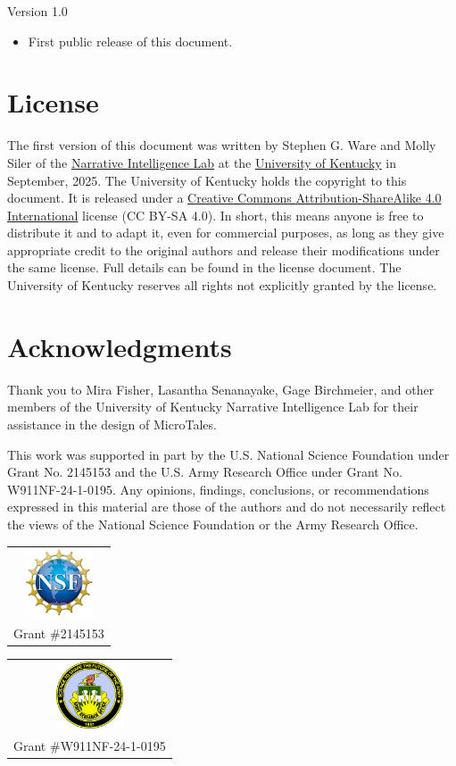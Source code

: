 \documentclass{nilreport}
\begin{document}
Version 1.0
\begin{itemize}
	\item First public release of this document.
\end{itemize}

\section{License}

The first version of this document was written by Stephen G. Ware and Molly Siler of the \href{http://cs.uky.edu/~sgware}{Narrative Intelligence Lab} at the \href{http://cs.uky.edu}{University of Kentucky} in September, 2025. The University of Kentucky holds the copyright to this document. It is released under a \href{http://creativecommons.org/licenses/by-sa/4.0/deed.en}{Creative Commons Attribution-ShareAlike 4.0 International} license (CC BY-SA 4.0). In short, this means anyone is free to distribute it and to adapt it, even for commercial purposes, as long as they give appropriate credit to the original authors and release their modifications under the same license. Full details can be found in the license document. The University of Kentucky reserves all rights not explicitly granted by the license.

\section{Acknowledgments}

Thank you to Mira Fisher, Lasantha Senanayake, Gage Birchmeier, and other members of the University of Kentucky Narrative Intelligence Lab for their assistance in the design of MicroTales.

This work was supported in part by the U.S. National Science Foundation under Grant No. 2145153 and the U.S. Army Research Office under Grant No. W911NF-24-1-0195. Any opinions, findings, conclusions, or recommendations expressed in this material are those of the authors and do not necessarily reflect the views of the National Science Foundation or the Army Research Office.

\begin{center}
\begin{tabular}{c}
\includegraphics[width=2cm]{images/nsflogo.png}\tabularnewline
Grant \#2145153\tabularnewline
\end{tabular}\quad{}%
\begin{tabular}{c}
\includegraphics[width=2cm]{images/arologo.png}\tabularnewline
Grant \#W911NF-24-1-0195\tabularnewline
\end{tabular}
\par\end{center}




\end{document}
